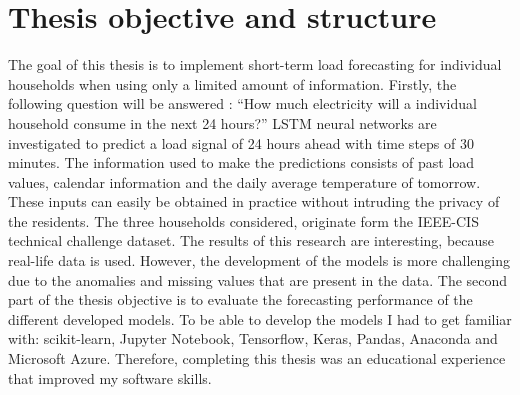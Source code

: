 \section{Thesis objective and structure}
The goal of this thesis is to implement short-term load forecasting for individual households when using only a limited amount of information. Firstly, the following question will be answered : ``How much electricity will a individual household consume in the next 24 hours?'' LSTM neural networks are investigated to predict a load signal of 24 hours ahead with time steps of 30 minutes. The information used to make the predictions consists of past load values, calendar information and the daily average temperature of tomorrow. These inputs can easily be obtained in practice without intruding the privacy of the residents. The three households considered, originate form the IEEE-CIS technical challenge dataset. The results of this research are interesting, because real-life data is used. However, the development of the models is more challenging due to the anomalies and missing values that are present in the data. The second part of the thesis objective is to evaluate the forecasting performance of the different developed models. To be able to develop the models I had to get familiar with: scikit-learn, Jupyter Notebook, Tensorflow, Keras, Pandas, Anaconda and Microsoft Azure. Therefore, completing this thesis was an educational experience that improved my software skills.\\ 

